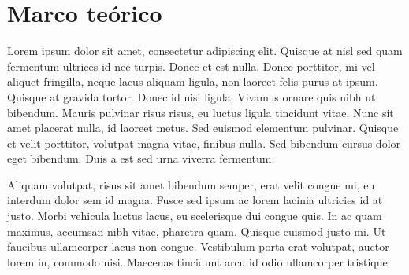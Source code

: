 \section{Marco teórico}

Lorem ipsum dolor sit amet, consectetur adipiscing elit. Quisque at nisl sed quam fermentum ultrices id nec turpis. Donec et est nulla. Donec porttitor, mi vel aliquet fringilla, neque lacus aliquam ligula, non laoreet felis purus at ipsum. Quisque at gravida tortor. Donec id nisi ligula. Vivamus ornare quis nibh ut bibendum. Mauris pulvinar risus risus, eu luctus ligula tincidunt vitae. Nunc sit amet placerat nulla, id laoreet metus. Sed euismod elementum pulvinar. Quisque et velit porttitor, volutpat magna vitae, finibus nulla. Sed bibendum cursus dolor eget bibendum. Duis a est sed urna viverra fermentum.

Aliquam volutpat, risus sit amet bibendum semper, erat velit congue mi, eu interdum dolor sem id magna. Fusce sed ipsum ac lorem lacinia ultricies id at justo. Morbi vehicula luctus lacus, eu scelerisque dui congue quis. In ac quam maximus, accumsan nibh vitae, pharetra quam. Quisque euismod justo mi. Ut faucibus ullamcorper lacus non congue. Vestibulum porta erat volutpat, auctor lorem in, commodo nisi. Maecenas tincidunt arcu id odio ullamcorper tristique.